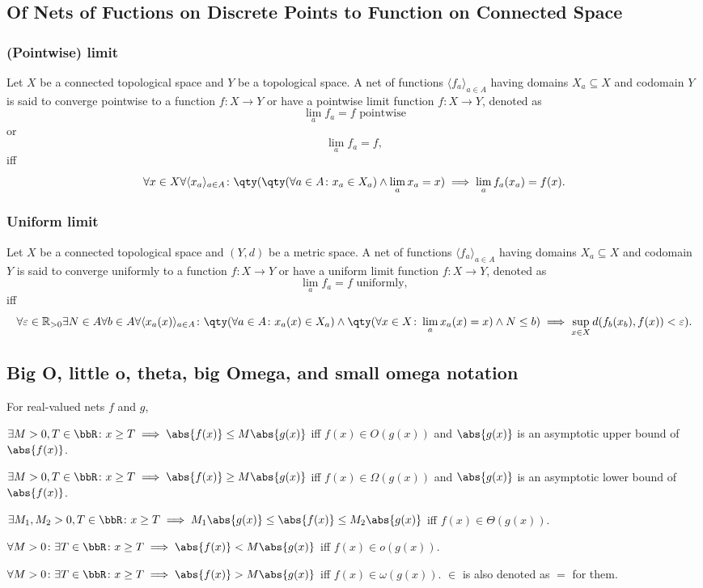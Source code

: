 \documentclass[a4paper,12pt]{report}
\begin{document}
\subsection{Of Nets of Fuctions on Discrete Points to Function on Connected Space}
\subsubsection{(Pointwise) limit}
Let $X$ be a connected topological space and $Y$ be a topological space. A net of functions $\langle f_a\rangle_{a\in A}$ having domains $X_a\subseteq X$ and codomain $Y$ is said to converge pointwise to a function $f\colon X\to Y$ or have a pointwise limit function $f\colon X\to Y$, denoted as 
\[\lim_af_a=f\text{\ pointwise}\]
or
\[\lim_af_a=f,\]
iff
\[\forall x\in X\forall\langle x_a\rangle_{a\in A}\colon\qty(\qty(\forall a\in A\colon x_a\in X_a)\land\lim_ax_a=x)\implies\lim_af_a(x_a)=f(x).\]
\subsubsection{Uniform limit}
Let $X$ be a connected topological space and $(Y,d)$ be a metric space. A net of functions $\langle f_a\rangle_{a\in A}$ having domains $X_a\subseteq X$ and codomain $Y$ is said to converge uniformly to a function $f\colon X\to Y$ or have a uniform limit function $f\colon X\to Y$, denoted as 
\[\lim_af_a=f\text{\ uniformly},\]
iff
\[\forall\varepsilon\in\mathbb{R}_{>0}\exists N\in A\forall b\in A\forall\langle x_a(x)\rangle_{a\in A}\colon\qty(\forall a\in A\colon x_a(x)\in X_a)\land\qty(\forall x\in X\colon\lim_ax_a(x)=x)\land N\leq b)\implies\sup_{x\in X}d(f_b(x_b),f(x))<\varepsilon).\]
\subsection{Big O, little o, theta, big Omega, and small omega notation}
For real-valued nets $f$ and $g$,
\bit
\item $\exists M>0,T\in\bbR\colon x\ge T\implies\abs{f(x)}\le M\abs{g(x)}$ iff $f(x)\in O(g(x))$ and $\abs{g(x)}$ is an asymptotic upper bound of $\abs{f(x)}$.
\item $\exists M>0,T\in\bbR\colon x\ge T\implies\abs{f(x)}\ge M\abs{g(x)}$ iff $f(x)\in \Omega(g(x))$ and $\abs{g(x)}$ is an asymptotic lower bound of $\abs{f(x)}$.
\item $\exists M_1,M_2>0,T\in\bbR\colon x\ge T\implies M_1\abs{g(x)}\le\abs{f(x)}\le M_2\abs{g(x)}$ iff $f(x)\in \Theta(g(x))$.
\item $\forall M>0\colon\exists T\in\bbR\colon x\ge T\implies\abs{f(x)}<M\abs{g(x)}$ iff $f(x)\in o(g(x))$.
\item $\forall M>0\colon\exists T\in\bbR\colon x\ge T\implies\abs{f(x)}>M\abs{g(x)}$ iff $f(x)\in \omega(g(x))$.
\eit
$\in$ is also denoted as $=$ for them.
\end{document}
